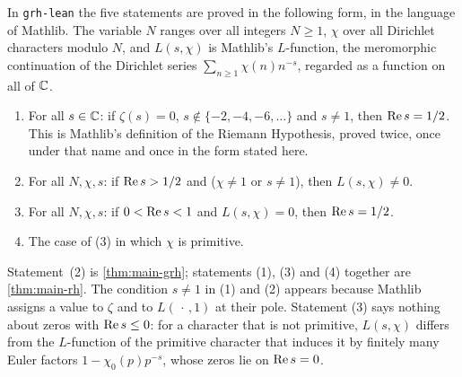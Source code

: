 In \texttt{grh-lean} the five statements are proved in the following form, in the language of
Mathlib. The variable $N$ ranges over all integers $N\ge1$, $\chi$ over all Dirichlet characters
modulo $N$, and $L(s,\chi)$ is Mathlib's $L$-function, the meromorphic continuation of the Dirichlet
series $\sum_{n\ge1}\chi(n)n^{-s}$, regarded as a function on all of $\mathbb{C}$.
\begin{enumerate}[label=\textup{(\arabic*)},leftmargin=2em]
\item For all $s\in\mathbb{C}$: if $\zeta(s)=0$, $s\notin\{-2,-4,-6,\dots\}$ and $s\neq1$, then
$\operatorname{Re} s=1/2$. This is Mathlib's definition of the Riemann Hypothesis, proved twice, once under that
name and once in the form stated here.
\item For all $N,\chi,s$: if $\operatorname{Re} s>1/2$ and ($\chi\neq1$ or $s\neq1$), then $L(s,\chi)\neq0$.
\item For all $N,\chi,s$: if $0<\operatorname{Re} s<1$ and $L(s,\chi)=0$, then $\operatorname{Re} s=1/2$.
\item The case of (3) in which $\chi$ is primitive.
\end{enumerate}

Statement~(2) is \cref{thm:main-grh}; statements (1), (3) and (4) together are \cref{thm:main-rh}.
The condition $s\neq1$ in (1) and (2) appears because Mathlib assigns a value to $\zeta$ and to
$L(\,\cdot\,,1)$ at their pole. Statement (3) says nothing about zeros with $\operatorname{Re} s\le0$: for a
character that is not primitive, $L(s,\chi)$ differs from the $L$-function of the primitive character
that induces it by finitely many Euler factors $1-\chi_0(p)p^{-s}$, whose zeros lie on $\operatorname{Re} s=0$.

